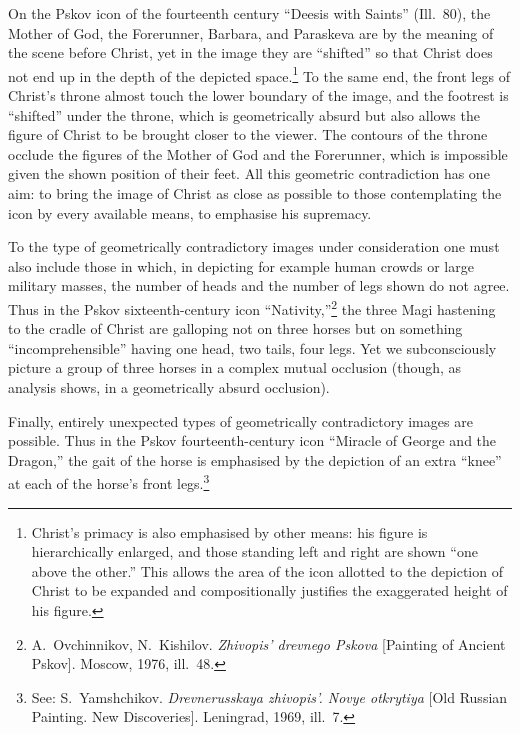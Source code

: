 On the Pskov icon of the fourteenth century ``Deesis with Saints'' (Ill.~80), the Mother
of God, the Forerunner, Barbara, and Paraskeva are by the meaning of the scene before
Christ, yet in the image they are ``shifted'' so that Christ does not end up in the depth
of the depicted space.\footnote{Christ's primacy is also emphasised by other means: his
  figure is hierarchically enlarged, and those standing left and right are shown ``one
  above the other.''  This allows the area of the icon allotted to the depiction of Christ
  to be expanded and compositionally justifies the exaggerated height of his figure.}
To the same end, the front legs of Christ's throne almost touch the lower boundary of
the image, and the footrest is ``shifted'' under the throne, which is geometrically
absurd but also allows the figure of Christ to be brought closer to the viewer.  The
contours of the throne occlude the figures of the Mother of God and the Forerunner, which
is impossible given the shown position of their feet.  All this geometric contradiction
has one aim: to bring the image of Christ as close as possible to those contemplating
the icon by every available means, to emphasise his supremacy.




To the type of geometrically contradictory images under consideration one must also
include those in which, in depicting for example human crowds or large military masses,
the number of heads and the number of legs shown do not agree.  Thus in the Pskov
sixteenth-century icon ``Nativity,''\footnote{A.~Ovchinnikov, N.~Kishilov.
  \emph{Zhivopis' drevnego Pskova} [Painting of Ancient Pskov].  Moscow, 1976, ill.~48.}
the three Magi hastening to the cradle of Christ are galloping not on three horses but
on something ``incomprehensible'' having one head, two tails, four legs.  Yet we
subconsciously picture a group of three horses in a complex mutual occlusion (though, as
analysis shows, in a geometrically absurd occlusion).

Finally, entirely unexpected types of geometrically contradictory images are possible.
Thus in the Pskov fourteenth-century icon ``Miracle of George and the Dragon,'' the gait
of the horse is emphasised by the depiction of an extra ``knee'' at each of the horse's
front legs.\footnote{See: S.~Yamshchikov.  \emph{Drevnerusskaya zhivopis'.  Novye
  otkrytiya} [Old Russian Painting.  New Discoveries].  Leningrad, 1969, ill.~7.}

